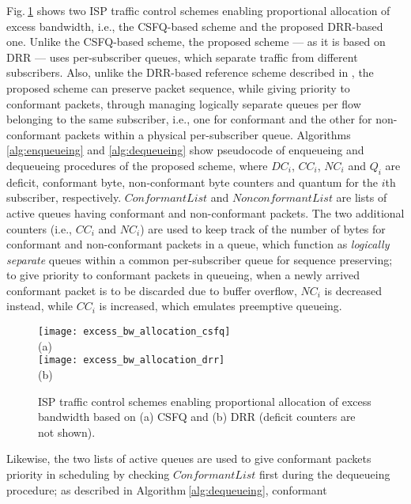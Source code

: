 \documentclass[conference,twoside,final]{IEEEtran}
\begin{document}
Fig.\(~\)\ref{fg:isp_traffic_control_schemes} shows two ISP traffic control
schemes enabling proportional allocation of excess bandwidth, i.e., the
CSFQ-based scheme \cite{Kim:14-1} and the proposed DRR-based one. Unlike the
CSFQ-based scheme, the proposed scheme --- as it is based on DRR --- uses
per-subscriber queues, which separate traffic from different subscribers. Also,
unlike the DRR-based reference scheme described in \cite{Kim:14-1}, the proposed
scheme can preserve packet sequence, while giving priority to conformant
packets, through managing logically separate queues per flow belonging to the
same subscriber, i.e., one for conformant and the other for non-conformant
packets within a physical per-subscriber
queue. Algorithms\(~\)\ref{alg:enqueueing} and \ref{alg:dequeueing} show
pseudocode of enqueueing and dequeueing procedures of the proposed scheme, where
\(DC_{i}\), \(CC_{i}\), \(NC_{i}\) and \(Q_{i}\) are deficit, conformant byte,
non-conformant byte counters and quantum for the \(i\)th subscriber,
respectively. \(ConformantList\) and \(NonconformantList\) are lists of active
queues having conformant and non-conformant packets. The two additional counters
(i.e., \(CC_{i}\) and \(NC_{i}\)) are used to keep track of the number of bytes
for conformant and non-conformant packets in a queue, which function as
\textit{logically separate} queues within a common per-subscriber queue for
sequence preserving; to give priority to conformant packets in queueing, when a
newly arrived conformant packet is to be discarded due to buffer overflow,
\(NC_{i}\) is decreased instead, while \(CC_{i}\) is increased, which emulates
preemptive queueing.
\begin{figure}[!t]
\begin{center}
\texttt{[image: excess\_bw\_allocation\_csfq]}\\
  {\scriptsize (a)}\\
  \texttt{[image: excess\_bw\_allocation\_drr]}\\
  {\scriptsize (b)}
\end{center}
\caption{ISP traffic control schemes enabling proportional allocation of excess bandwidth
    based on (a) CSFQ \cite{Kim:14-1} and (b) DRR (deficit counters are not shown).}
\label{fg:isp_traffic_control_schemes}
\end{figure}
Likewise, the two lists of active queues are used to give conformant packets
priority in scheduling by checking \(ConformantList\) first during the dequeueing
procedure; as described in Algorithm\(~\)\ref{alg:dequeueing}, conformant
\end{document}
